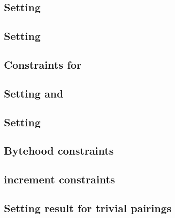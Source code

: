 \subsection{Setting \blsIndex{}}                              \label{bls: generalities: setting index}                      
\subsection{Setting           \maxCt{}}                       \label{bls: generalities: setting ct_max}                     
\subsection{Constraints for \ct{}}                            \label{bls: generalities: setting ct}                         
\subsection{Setting \isFirstInput{} and \isSecondInput{}}     \label{bls: generalities: setting is_first and is_second}     
\subsection{Setting \accInputs{}}                             \label{bls: generalities: setting acc pairings}               
\subsection{Bytehood constraints}                             \label{bls: generalities: bytehood and accumulator}           
\subsection{\blsId{} increment constraints}                   \label{bls: generalities: stamp increments}                   
\subsection{Setting result for trivial pairings}              \label{bls: generalities: trivial result}                     
